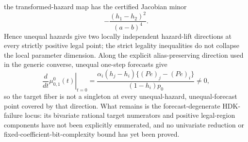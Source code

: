 the transformed-hazard map has the certified Jacobian minor
\[
 -\frac{(h_1-h_2)^2}{(a-b)^4}.
\]
Hence unequal hazards give two locally independent hazard-lift directions at every strictly positive legal point; the strict legality inequalities do not collapse the local parameter dimension. Along the explicit alias-preserving direction used in the generic converse, unequal one-step forecasts give
\[
 \left.\frac{d}{dt}\mu^0_{0,1}(t)\right|_{t=0}
 =\frac{\alpha_i(h_j-h_i)\{(Pe)_j-(Pe)_i\}}{(1-h_i)p_0}\ne0,
\]
so the target fiber is not a singleton at every unequal-hazard, unequal-forecast point covered by that direction. What remains is the forecast-degenerate HDK-failure locus: its bivariate rational target numerators and positive legal-region components have not been explicitly enumerated, and no univariate reduction or fixed-coefficient-bit-complexity bound has yet been proved.

